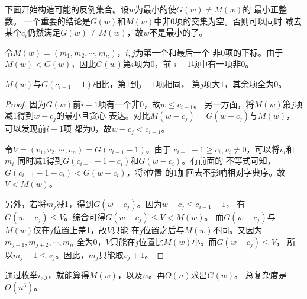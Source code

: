 \begin{sol}
	下面开始构造可能的反例集合。设$w$为最小的使$G(w) \not = M(w)$的
	最小正整数。
	一个重要的结论是$G(w)$和$M(w)$中非0项的交集为空。否则可以同时
	减去某个$c_i$仍然满足$G(w) \not = M(w)$，故$w$不是最小的了。
	\par
	令$M(w) = (m_1, m_2, \cdots, m_n)$，$i,j$为第一个和最后一个
	非0项的下标。由于$M(w) < G(w)$，因此$G(w)$第$i$项为0，前
	$i-1$项中有一项非0。
	\begin{theorem}
		$M(w)$与$G(c_{i-1}-1)$相比，第$1$到$j-1$项相同，
		第$j$项大$1$，其余项全为0。
	\end{theorem}
	\begin{proof}
		因为$G(w)$前$i-1$项有一个非0，故$w \le c_{i-1}$。
		另一方面，将$M(w)$第$j$项减1得到$w-c_j$的最小且贪心
		表达。对比$M(w-c_j)=G(w-c_j)$与$M(w)$，可以发现前$i-1$项
		都为0，故$w-c_j < c_{i-1}$。
		\par
		令$V = (v_1, v_2, \cdots, v_n) = G(c_{i-1}-1)$。由于
		$c_{i-1} - 1 \ge c_i, v_i \not = 0$，可以将$v_i$和$m_i$
		同时减1得到$G(c_{i-1}-1-c_i)$和$G(w-c_i)$。有前面的
		不等式可知，$G(c_{i-1}-1-c_i) < G(w-c_i)$，将$i$位置
		的1加回去不影响相对字典序。故$V < M(w)$。\par
		另外，若将$m_j$减1，得到$G(w-c_j)$。因为$w-c_j \le c_{i-1}-1$，
		有$G(w-c_j) \le V$。综合可得$G(w-c_j) \le V < M(w)$。
		而$G(w-c_j)$与$M(w)$仅在$j$位置上差1，故$V$只能
		在$j$位置之后与$M(w)$不同。又因为$m_{j+1},m_{j+2}, \cdots, m_n$
		全为0，$V$只能在$j$位置比$M(w)$小。而$G(w-c_j) \le V$，
		所以$m_j - 1 \le v_j$。因此，$m_j$只能取$v_j+1$。
	\end{proof}
	通过枚举$i,j$，就能算得$M(w)$，以及$w$。再$O(n)$求出$G(w)$。
	总复杂度是$O(n^3)$。
\end{sol}
